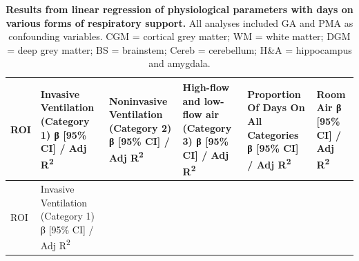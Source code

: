 \documentclass[
  letterpaper,
  DIV=11,
  numbers=noendperiod]{scrartcl}
\begin{document}
\begin{longtable}[]{@{}
  >{\raggedright\arraybackslash}p{}
  >{\raggedright\arraybackslash}p{}
  >{\raggedright\arraybackslash}p{}
  >{\raggedright\arraybackslash}p{}
  >{\raggedright\arraybackslash}p{}
  >{\raggedright\arraybackslash}p{}@{}}
\caption{\textbf{Results from linear regression of physiological
parameters with days on various forms of respiratory support.} All
analyses included GA and PMA as confounding variables. CGM = cortical
grey matter; WM = white matter; DGM = deep grey matter; BS = brainstem;
Cereb = cerebellum; H\&A = hippocampus and
amygdala.}\label{tbl-linreg}\tabularnewline
\toprule\noalign{}
\begin{minipage}[b]{\linewidth}\raggedright
ROI
\end{minipage} & \begin{minipage}[b]{\linewidth}\raggedright
Invasive Ventilation (Category 1) β {[}95\% CI{]} / Adj
R\textsuperscript{2}
\end{minipage} & \begin{minipage}[b]{\linewidth}\raggedright
Noninvasive Ventilation (Category 2) β {[}95\% CI{]} / Adj
R\textsuperscript{2}
\end{minipage} & \begin{minipage}[b]{\linewidth}\raggedright
High-flow and low-flow air (Category 3) β {[}95\% CI{]} / Adj
R\textsuperscript{2}
\end{minipage} & \begin{minipage}[b]{\linewidth}\raggedright
Proportion Of Days On All Categories β {[}95\% CI{]} / Adj
R\textsuperscript{2}
\end{minipage} & \begin{minipage}[b]{\linewidth}\raggedright
Room Air β {[}95\% CI{]} / Adj R\textsuperscript{2}
\end{minipage} \\
\midrule\noalign{}
\endfirsthead
\toprule\noalign{}
\begin{minipage}[b]{\linewidth}\raggedright
ROI
\end{minipage} & \begin{minipage}[b]{\linewidth}\raggedright
Invasive Ventilation (Category 1) β {[}95\% CI{]} / Adj
R\textsuperscript{2}
\end{minipage} & \begin{minipage}[b]{\linewidth}\raggedright

\end{minipage}
\end{longtable}
\end{document}
